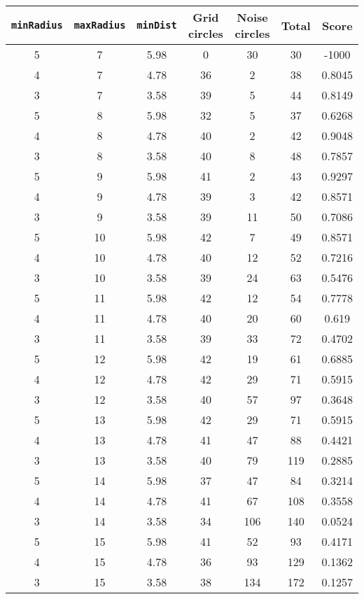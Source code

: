 \documentclass[letterpaper, 12pt]{article}
\begin{document}
\begin{longtable}{|c|c|c|c|c|c|c|}
\hline
\textbf{\texttt{minRadius}} & \textbf{\texttt{maxRadius}} & \textbf{\texttt{minDist}} & \textbf{Grid circles} & \textbf{Noise circles} & \textbf{Total} & \textbf{Score} \\
\hline
5 & 7 & 5.98 & 0 & 30 & 30 & -1000 \\
\hline
4 & 7 & 4.78 & 36 & 2 & 38 & 0.8045 \\
\hline
3 & 7 & 3.58 & 39 & 5 & 44 & 0.8149 \\
\hline
5 & 8 & 5.98 & 32 & 5 & 37 & 0.6268 \\
\hline
4 & 8 & 4.78 & 40 & 2 & 42 & 0.9048 \\
\hline
3 & 8 & 3.58 & 40 & 8 & 48 & 0.7857 \\
\hline
5 & 9 & 5.98 & 41 & 2 & 43 & 0.9297 \\
\hline
4 & 9 & 4.78 & 39 & 3 & 42 & 0.8571 \\
\hline
3 & 9 & 3.58 & 39 & 11 & 50 & 0.7086 \\
\hline
5 & 10 & 5.98 & 42 & 7 & 49 & 0.8571 \\
\hline
4 & 10 & 4.78 & 40 & 12 & 52 & 0.7216 \\
\hline
3 & 10 & 3.58 & 39 & 24 & 63 & 0.5476 \\
\hline
5 & 11 & 5.98 & 42 & 12 & 54 & 0.7778 \\
\hline
4 & 11 & 4.78 & 40 & 20 & 60 & 0.619 \\
\hline
3 & 11 & 3.58 & 39 & 33 & 72 & 0.4702 \\
\hline
5 & 12 & 5.98 & 42 & 19 & 61 & 0.6885 \\
\hline
4 & 12 & 4.78 & 42 & 29 & 71 & 0.5915 \\
\hline
3 & 12 & 3.58 & 40 & 57 & 97 & 0.3648 \\
\hline
5 & 13 & 5.98 & 42 & 29 & 71 & 0.5915 \\
\hline
4 & 13 & 4.78 & 41 & 47 & 88 & 0.4421 \\
\hline
3 & 13 & 3.58 & 40 & 79 & 119 & 0.2885 \\
\hline
5 & 14 & 5.98 & 37 & 47 & 84 & 0.3214 \\
\hline
4 & 14 & 4.78 & 41 & 67 & 108 & 0.3558 \\
\hline
3 & 14 & 3.58 & 34 & 106 & 140 & 0.0524 \\
\hline
5 & 15 & 5.98 & 41 & 52 & 93 & 0.4171 \\
\hline
4 & 15 & 4.78 & 36 & 93 & 129 & 0.1362 \\
\hline
3 & 15 & 3.58 & 38 & 134 & 172 & 0.1257 \\

\end{longtable}
\end{document}
